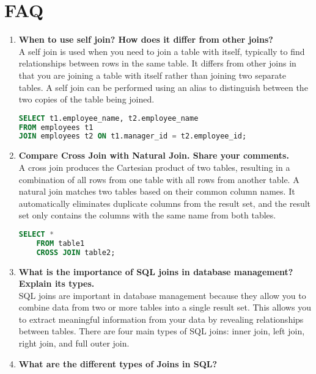 \documentclass[11pt]{article}
\begin{document}
\section{FAQ}
\begin{enumerate}
	\item \textbf{When to use self join? How does it differ from other joins?}\\

	      A self join is used when you need to join a table with itself, typically to find relationships between rows in the same table. It differs from other joins in that you are joining a table with itself rather than joining two separate tables. A self join can be performed using an alias to distinguish between the two copies of the table being joined.


	      \begin{lstlisting}[language=sql]
SELECT t1.employee_name, t2.employee_name 
FROM employees t1 
JOIN employees t2 ON t1.manager_id = t2.employee_id;
\end{lstlisting}

	\item \textbf{Compare Cross Join with Natural Join. Share your comments.}\\

	      A cross join produces the Cartesian product of two tables, resulting in a combination of all rows from one table with all rows from another table. A natural join matches two tables based on their common column names. It automatically eliminates duplicate columns from the result set, and the result set only contains the columns with the same name from both tables.

	      \begin{lstlisting}[language=sql]
	SELECT *
	FROM table1
	CROSS JOIN table2;
\end{lstlisting}

	\item \textbf{What is the importance of SQL joins in database management? Explain its types.}\\

	      SQL joins are important in database management because they allow you to combine data from two or more tables into a single result set. This allows you to extract meaningful information from your data by revealing relationships between tables. There are four main types of SQL joins: inner join, left join, right join, and full outer join.


	\item \textbf{What are the different types of Joins in SQL?}\\


\end{enumerate}
\end{document}
